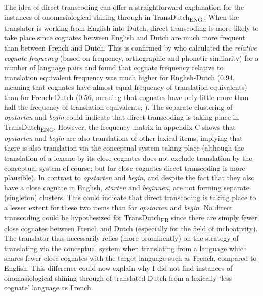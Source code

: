 The idea of direct transcoding can offer a straightforward explanation for the instances of onomasiological shining through in TransDutch\textsubscript{ENG.}. When the translator is working from English into Dutch, direct transcoding is more likely to take place since cognates between English and Dutch are much more frequent than between French and Dutch. This is confirmed by \citet{schepens_cross-language_2013} who calculated the \textit{relative} \textit{cognate} \textit{frequency} (based on frequency, orthographic and phonetic similarity) for a number of language pairs and found that cognate frequency relative to translation equivalent frequency was much higher for English-Dutch (0.94, meaning that cognates have almost equal frequency of translation equivalents) than for French-Dutch (0.56, meaning that cognates have only little more than half the frequency of translation equivalents; \citealt[4]{schepens_cross-language_2013}). The separate clustering of \textit{opstarten} and \textit{begin} could indicate that direct transcoding is taking place in TransDutch\textsubscript{ENG}. However, the frequency matrix in appendix C shows that \textit{opstarten} and \textit{begin} are also translations of other lexical items, implying that there is also translation via the conceptual system taking place (although the translation of a lexeme by its close cognates does not exclude translation by the conceptual system of course; but for close cognates direct transcoding is more plausible). In contrast to \textit{opstarten} and \textit{begin}, and despite the fact that they also have a close cognate in English, \textit{starten} and \textit{beginnen}, are not forming separate (singleton) clusters. This could indicate that direct transcoding is taking place to a lesser extent for these two items than for \textit{opstarten} and \textit{begin}. No direct transcoding could be hypothesized for TransDutch\textsubscript{FR} since there are simply fewer close cognates between French and Dutch (especially for the field of inchoativity). The translator thus necessarily relies (more prominently) on the strategy of translating via the conceptual system when translating from a language which shares fewer close cognates with the target language such as French, compared to English. This difference could now explain why I did not find instances of onomasiological shining through of translated Dutch from a lexically ‘less cognate’ language as French.

